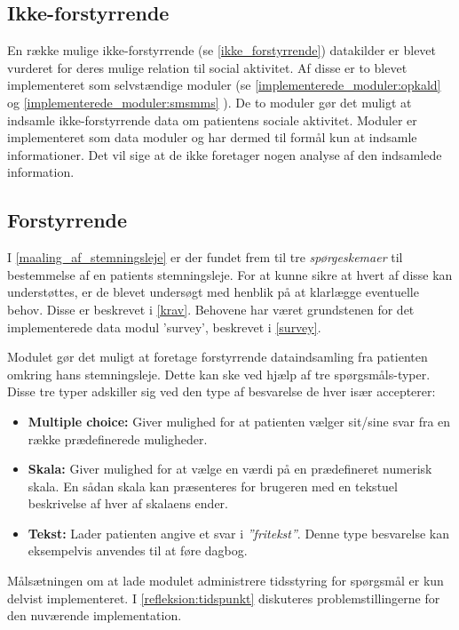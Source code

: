 \subsection{Ikke-forstyrrende}
En række mulige ikke-forstyrrende (se \cref{ikke_forstyrrende}) datakilder er blevet vurderet for deres mulige relation til social aktivitet.
Af disse er to blevet implementeret som selvstændige moduler (se \cref{implementerede_moduler:opkald}  og \cref{implementerede_moduler:smsmms} ).
De to moduler gør det muligt at indsamle ikke-forstyrrende data om patientens sociale aktivitet.
Moduler er implementeret som data moduler og har dermed til formål kun at indsamle informationer.
Det vil sige at de ikke foretager nogen analyse af den indsamlede information.

\subsection{Forstyrrende}
I \cref{maaling_af_stemningsleje} er der fundet frem til tre \textit{spørgeskemaer} til bestemmelse af en patients stemningsleje.
For at kunne sikre at hvert af disse kan understøttes, er de blevet undersøgt med henblik på at klarlægge eventuelle behov.
Disse er beskrevet i \cref{krav}.
Behovene har været grundstenen for det implementerede data modul 'survey', beskrevet i \cref{survey}.

Modulet gør det muligt at foretage forstyrrende dataindsamling fra patienten omkring hans stemningsleje.
Dette kan ske ved hjælp af tre spørgsmåls-typer.
Disse tre typer adskiller sig ved den type af besvarelse de hver især accepterer:
\begin{itemize}
\item \textbf{Multiple choice:} Giver mulighed for at patienten vælger sit/sine svar fra en række prædefinerede muligheder.
\item \textbf{Skala:} Giver mulighed for at vælge en værdi på en prædefineret numerisk skala.
En sådan skala kan præsenteres for brugeren med en tekstuel beskrivelse af hver af skalaens ender.
\item \textbf{Tekst:} Lader patienten angive et svar i \textit{''fritekst''}.
Denne type besvarelse kan eksempelvis anvendes til at føre dagbog.
\end{itemize}
Målsætningen om at lade modulet administrere tidsstyring for spørgsmål er kun delvist implementeret.
I \cref{refleksion:tidspunkt} diskuteres problemstillingerne for den nuværende implementation.
